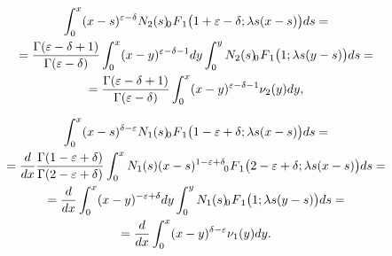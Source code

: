 \begin{multline}

\int _0^x (x-s)^{\varepsilon-\delta}N_2(s)  \,\,

F_{\hspace{-4mm}0 \hspace{3mm}1} \bigl(1+\varepsilon-\delta;\lambda s (x-s)\bigr) ds =

\\ 

= \frac{\Gamma(\varepsilon-\delta+1)}{\Gamma(\varepsilon-\delta)}  \int _0^x (x-y)^{\varepsilon-\delta-1} dy \int _0^yN_2(s)  \,\,

F_{\hspace{-4mm}0 \hspace{3mm}1} \bigl(1;\lambda s (y-s)\bigr) ds = 

\\

\label{dolg:eq12}

= \frac{\Gamma(\varepsilon-\delta+1)}{\Gamma(\varepsilon-\delta)} \int _0^x (x-y)^{\varepsilon-\delta-1} \nu_2(y) dy,

\end{multline}

\begin{multline}

\int _0^x (x-s)^{\delta-\varepsilon}N_1(s)  \,\,

F_{\hspace{-4mm}0 \hspace{3mm}1} \bigl(1-\varepsilon+\delta;\lambda s (x-s)\bigr) ds =

\\

= \frac{d}{dx} \frac{\Gamma(1-\varepsilon+\delta)}{\Gamma(2-\varepsilon+\delta)} \int _0^x N_1(s) (x-s)^{1-\varepsilon+\delta} \,\,

F_{\hspace{-4mm}0 \hspace{3mm}1} \bigl(2-\varepsilon+\delta;\lambda s (x-s)\bigr) ds = 

\\

= \frac{d}{dx} \int _0^x (x-y)^{-\varepsilon+\delta} dy \int _0^yN_1(s)  \,\,

F_{\hspace{-4mm}0 \hspace{3mm}1} \bigl(1;\lambda s (y-s)\bigr) ds = 

\\

\label{dolg:eq13}

= \frac{d}{dx} \int _0^x (x-y)^{\delta-\varepsilon} \nu_1(y) dy.

\end{multline}



